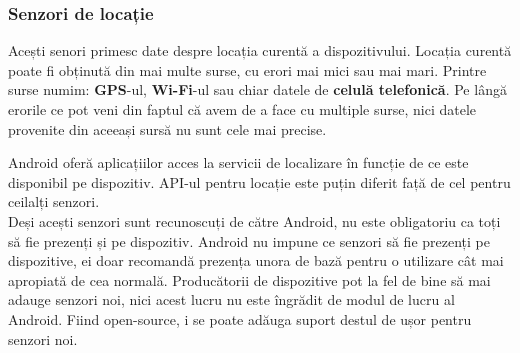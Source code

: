 \documentclass[12pt,a4paper]{article}
\begin{document}
\subsubsection{Senzori de locație}
Acești senori primesc date despre locația curentă a dispozitivului. Locația curentă poate fi obținută din mai multe surse, cu erori mai mici sau mai mari. Printre surse numim: \textbf{GPS}-ul, \textbf{Wi-Fi}-ul sau chiar datele de \textbf{celulă telefonică}. Pe lângă erorile ce pot veni din faptul că avem de a face cu multiple surse, nici datele provenite din aceeași sursă nu sunt cele mai precise.

Android oferă aplicațiilor acces la servicii de localizare în funcție de ce este disponibil pe dispozitiv. API-ul pentru locație este puțin diferit față de cel pentru ceilalți senzori.\\

Deși acești senzori sunt recunoscuți de către Android, nu este obligatoriu ca toți să fie prezenți și pe dispozitiv. Android nu impune ce senzori să fie prezenți pe dispozitive, ei doar recomandă prezența unora de bază pentru o utilizare cât mai apropiată de cea normală. Producătorii de dispozitive pot la fel de bine să mai adauge senzori noi, nici acest lucru nu este îngrădit de modul de lucru al Android. Fiind open-source, i se poate adăuga suport destul de ușor pentru senzori noi.
\end{document}
